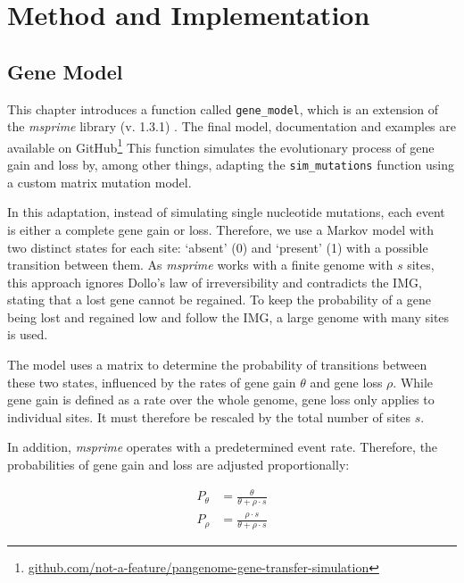 \chapter{Method and Implementation}
\section{Gene Model}
This chapter introduces a function called \texttt{gene_model}, which is an extension of the \textit{msprime} library (v. 1.3.1) \cite{msprime_github}.
The final model, documentation and examples are available on GitHub\footnote{\href{https://github.com/not-a-feature/pangenome-gene-transfer-simulation/}{github.com/not-a-feature/pangenome-gene-transfer-simulation}}
This function simulates the evolutionary process of gene gain and loss by, among other things, adapting the  \texttt{sim_mutations} function using a custom matrix mutation model.

In this adaptation, instead of simulating single nucleotide mutations, each event is either a complete gene gain or loss.
Therefore, we use a Markov model with two distinct states for each site: `absent' (0) and `present' (1) with a possible transition between them.
As \textit{msprime} works with a finite genome with $s$ sites, this approach ignores Dollo's law of irreversibility and contradicts the \ac{IMG}, stating that a lost gene cannot be regained.
To keep the probability of a gene being lost and regained low and follow the \ac{IMG}, a large genome with many sites is used.

The model uses a matrix to determine the probability of transitions between these two states, influenced by the rates of gene gain $\theta$ and gene loss $\rho$.
While gene gain is defined as a rate over the whole genome, gene loss only applies to individual sites.
It must therefore be rescaled by the total number of sites $s$.

In addition, \textit{msprime} operates with a predetermined event rate.
Therefore, the probabilities of gene gain and loss are adjusted proportionally:

\begin{equation}
    \begin{split}
        P_\theta & = \frac{\theta}{\theta + \rho \cdot s}       \\
        P_\rho   & = \frac{\rho \cdot s}{\theta + \rho \cdot s}
    \end{split}
\end{equation}


